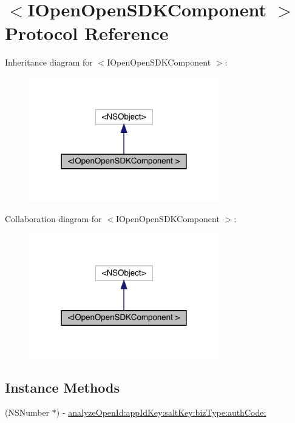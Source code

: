 \hypertarget{protocol_i_open_open_s_d_k_component_01-p}{}\section{$<$I\+Open\+Open\+S\+D\+K\+Component $>$ Protocol Reference}
\label{protocol_i_open_open_s_d_k_component_01-p}


Inheritance diagram for $<$I\+Open\+Open\+S\+D\+K\+Component $>$\+:\nopagebreak
\begin{figure}[H]
\begin{center}
\leavevmode
\includegraphics[width=234pt]{protocol_i_open_open_s_d_k_component_01-p__inherit__graph}
\end{center}
\end{figure}


Collaboration diagram for $<$I\+Open\+Open\+S\+D\+K\+Component $>$\+:\nopagebreak
\begin{figure}[H]
\begin{center}
\leavevmode
\includegraphics[width=234pt]{protocol_i_open_open_s_d_k_component_01-p__coll__graph}
\end{center}
\end{figure}
\subsection*{Instance Methods}
\begin{DoxyCompactItemize}
\item 
(N\+S\+Number $\ast$) -\/ \mbox{\hyperlink{protocol_i_open_open_s_d_k_component_01-p_a1e851758f5fa630b4866a5868e3ba610}{analyze\+Open\+Id\+:app\+Id\+Key\+:salt\+Key\+:biz\+Type\+:auth\+Code\+:}}
\end{DoxyCompactItemize}


